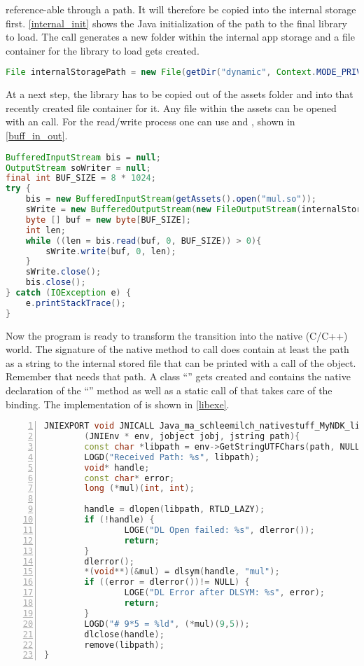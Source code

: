 reference-able through a path. It will therefore be copied into the internal storage first. \autoref{internal_init} shows the Java initialization of the path to the final library to load. The  call generates a new folder within the internal app storage and a file container for the library to load gets created. 
\begin{lstlisting}[language=Java, caption=Internal Storage Initialization, label=internal_init]
File internalStoragePath = new File(getDir("dynamic", Context.MODE_PRIVATE), "mul.so");
\end{lstlisting}
At a next step, the library has to be copied out of the assets folder and into that 
recently created file container for it. Any file within the assets can be opened with an
 call. For the read/write process one can use
 and , shown in 
\autoref{buff_in_out}.
\begin{lstlisting}[language=Java, caption=Buffered Input/Output, label=buff_in_out]
BufferedInputStream bis = null;
OutputStream soWriter = null;
final int BUF_SIZE = 8 * 1024;
try {
    bis = new BufferedInputStream(getAssets().open("mul.so"));
    sWrite = new BufferedOutputStream(new FileOutputStream(internalStoragePath));
    byte [] buf = new byte[BUF_SIZE];
    int len;
    while ((len = bis.read(buf, 0, BUF_SIZE)) > 0){
        sWrite.write(buf, 0, len);
    }
    sWrite.close();
    bis.close();
} catch (IOException e) {
    e.printStackTrace();
}
\end{lstlisting}
Now the program is ready to transform the transition into the native (C/C++) world.
The signature of the native method to call does contain at least the path as a string to
the internal stored file that can be printed with a  call of the
 object. Remember that  needs that path.
A class ``'' gets created and contains the native declaration of the
``'' method as well as a static call of 
 that takes care of the binding. 
The implementation of  is shown in \autoref{libexe}. 
\begin{lstlisting}[language=C++, caption=Native libExe(), label=libexe, numbers=left]
JNIEXPORT void JNICALL Java_ma_schleemilch_nativestuff_MyNDK_libExe
        (JNIEnv * env, jobject jobj, jstring path){
        const char *libpath = env->GetStringUTFChars(path, NULL);
        LOGD("Received Path: %s", libpath);
        void* handle;
        const char* error;
        long (*mul)(int, int);

        handle = dlopen(libpath, RTLD_LAZY);
        if (!handle) {
                LOGE("DL Open failed: %s", dlerror());
                return;
        }
        dlerror();
        *(void**)(&mul) = dlsym(handle, "mul");
        if ((error = dlerror())!= NULL) {
                LOGE("DL Error after DLSYM: %s", error);
                return;
        }
        LOGD("# 9*5 = %ld", (*mul)(9,5));
        dlclose(handle);
        remove(libpath);
}
\end{lstlisting}
